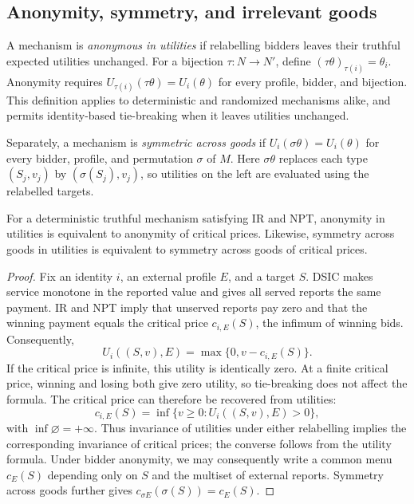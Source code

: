 \documentclass[format=acmsmall, review=false]{acmart}
\begin{document}
\subsection{Anonymity, symmetry, and irrelevant goods}

A mechanism is \emph{anonymous in utilities} if relabelling
bidders leaves their truthful expected utilities unchanged.
For a bijection $\tau:N\to N'$, define
$(\tau\theta)_{\tau(i)}=\theta_i$. Anonymity requires
$U_{\tau(i)}(\tau\theta)=U_i(\theta)$ for every profile, bidder,
and bijection. This definition applies to deterministic and
randomized mechanisms alike, and permits identity-based
tie-breaking when it leaves utilities unchanged.

Separately, a mechanism is \emph{symmetric across goods} if
$U_i(\sigma\theta)=U_i(\theta)$ for every bidder, profile, and
permutation $\sigma$ of $M$. Here $\sigma\theta$ replaces each
type $(S_j,v_j)$ by $(\sigma(S_j),v_j)$, so utilities on the
left are evaluated using the relabelled targets.

\begin{lemma}
\label{lem:utility-symmetry}
For a deterministic truthful mechanism satisfying IR and NPT,
anonymity in utilities is equivalent to anonymity of critical
prices. Likewise, symmetry across goods in utilities is
equivalent to symmetry across goods of critical prices.
\end{lemma}

\begin{proof}
Fix an identity $i$, an external profile $E$, and a target $S$.
DSIC makes service monotone in the reported value and gives
all served reports the same payment. IR and NPT imply that
unserved reports pay zero and that the winning payment equals
the critical price $c_{i,E}(S)$, the infimum of winning bids.
Consequently,
\[
U_i((S,v),E)=\max\{0,v-c_{i,E}(S)\}.
\]
If the critical price is infinite, this utility is identically
zero. At a finite critical price, winning and losing both give
zero utility, so tie-breaking does not affect the formula.
The critical price can therefore be recovered from utilities:
\[
c_{i,E}(S)
=\inf\{v\ge0:U_i((S,v),E)>0\},
\]
with $\inf\varnothing=+\infty$. Thus invariance of utilities
under either relabelling implies the corresponding invariance
of critical prices; the converse follows from the utility
formula. Under bidder anonymity, we may consequently write a
common menu $c_E(S)$ depending only on $S$ and the multiset
of external reports. Symmetry across goods further gives
$c_{\sigma E}(\sigma(S))=c_E(S)$.
\end{proof}
\end{document}
